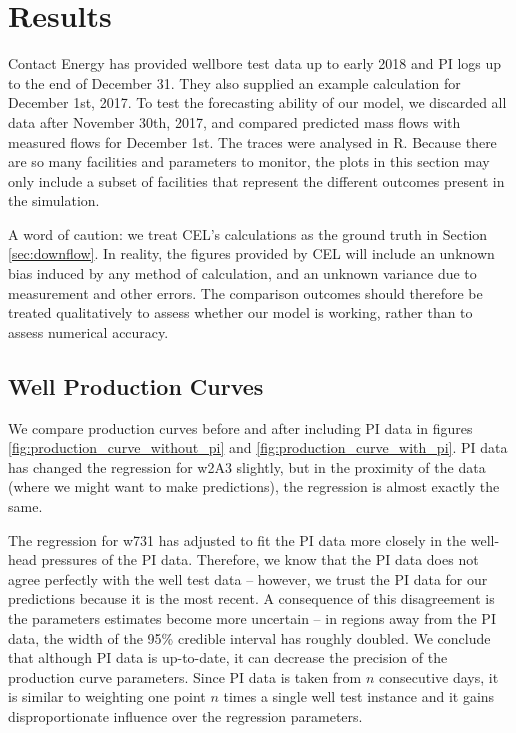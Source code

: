 \documentclass[a4paper, 12pt]{article}
\begin{document}
\section{Results}
Contact Energy has provided wellbore test data up to early 2018 and PI logs up to the end of December 31. They also supplied an example calculation for December 1st, 2017. To test the forecasting ability of our model, we discarded all data after November 30th, 2017, and compared predicted mass flows with measured flows for December 1st. The traces were analysed in R. Because there are so many facilities and parameters to monitor, the plots in this section may only include a subset of facilities that represent the different outcomes present in the simulation.

A word of caution: we treat CEL's calculations as the ground truth in Section \ref{sec:downflow}. In reality, the figures provided by CEL will include an unknown bias induced by any method of calculation, and an unknown variance due to measurement and other errors. The comparison outcomes should therefore be treated qualitatively to assess whether our model is working, rather than to assess numerical accuracy.

\subsection{Well Production Curves}

We compare production curves before and after including PI data in figures \ref{fig:production_curve_without_pi} and \ref{fig:production_curve_with_pi}. PI data has changed the regression for w2A3 slightly, but in the proximity of the data (where we might want to make predictions), the regression is almost exactly the same.

The regression for w731 has adjusted to fit the PI data more closely in the well-head pressures of the PI data. Therefore, we know that the PI data does not agree perfectly with the well test data -- however, we trust the PI data for our predictions because it is the most recent. A consequence of this disagreement is the parameters estimates become more uncertain -- in regions away from the PI data, the width of the 95\% credible interval has roughly doubled. We conclude that although PI data is up-to-date, it can decrease the precision of the production curve parameters. Since PI data is taken from $n$ consecutive days, it is similar to weighting one point $n$ times a single well test instance and it gains disproportionate influence over the regression parameters.
\end{document}
